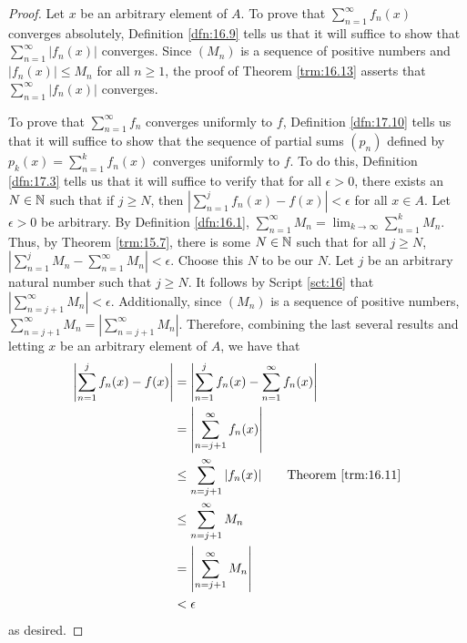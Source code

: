 \documentclass[../main.tex]{subfiles}
\begin{document}
\begin{theorem}
\begin{proof}
        Let $x$ be an arbitrary element of $A$. To prove that $\sum_{n=1}^\infty f_n(x)$ converges absolutely, Definition \ref{dfn:16.9} tells us that it will suffice to show that $\sum_{n=1}^\infty|f_n(x)|$ converges. Since $(M_n)$ is a sequence of positive numbers and $|f_n(x)|\leq M_n$ for all $n\geq 1$, the proof of Theorem \ref{trm:16.13} asserts that $\sum_{n=1}^\infty|f_n(x)|$ converges.\par
        To prove that $\sum_{n=1}^\infty f_n$ converges uniformly to $f$, Definition \ref{dfn:17.10} tells us that it will suffice to show that the sequence of partial sums $(p_n)$ defined by $p_k(x)=\sum_{n=1}^kf_n(x)$ converges uniformly to $f$. To do this, Definition \ref{dfn:17.3} tells us that it will suffice to verify that for all $\epsilon>0$, there exists an $N\in\mathbb{N}$ such that if $j\geq N$, then $|\sum_{n=1}^jf_n(x)-f(x)|<\epsilon$ for all $x\in A$. Let $\epsilon>0$ be arbitrary. By Definition \ref{dfn:16.1}, $\sum_{n=1}^\infty M_n=\lim_{k\to\infty}\sum_{n=1}^kM_n$. Thus, by Theorem \ref{trm:15.7}, there is some $N\in\mathbb{N}$ such that for all $j\geq N$, $|\sum_{n=1}^jM_n-\sum_{n=1}^\infty M_n|<\epsilon$. Choose this $N$ to be our $N$. Let $j$ be an arbitrary natural number such that $j\geq N$. It follows by Script \ref{sct:16} that $|\sum_{n=j+1}^\infty M_n|<\epsilon$. Additionally, since $(M_n)$ is a sequence of positive numbers, $\sum_{n=j+1}^\infty M_n=|\sum_{n=j+1}^\infty M_n|$. Therefore, combining the last several results and letting $x$ be an arbitrary element of $A$, we have that
        \begin{align*}
            \left| \sum_{n=1}^jf_n(x)-f(x) \right| &= \left| \sum_{n=1}^jf_n(x)-\sum_{n=1}^\infty f_n(x) \right|\\
            &= \left| \sum_{n=j+1}^\infty f_n(x) \right|\\
            &\leq \sum_{n=j+1}^\infty|f_n(x)|\tag*{Theorem \ref{trm:16.11}}\\
            &\leq \sum_{n=j+1}^\infty M_n\\
            &= \left| \sum_{n=j+1}^\infty M_n \right|\\
            &< \epsilon
        \end{align*}
        as desired.
    \end{proof}
\end{theorem}
\end{document}
